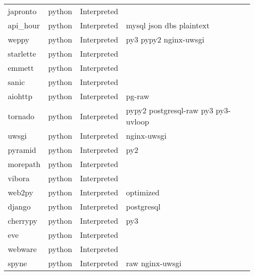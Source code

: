 \begin{longtable}{llll}
    japronto         & python      & Interpreted &                                                    \\
    api\_hour        & python      & Interpreted & mysql json dbs plaintext                           \\
    weppy            & python      & Interpreted & py3 pypy2 nginx-uwsgi                              \\
    starlette        & python      & Interpreted &                                                    \\
    emmett           & python      & Interpreted &                                                    \\
    sanic            & python      & Interpreted &                                                    \\
    aiohttp          & python      & Interpreted & pg-raw                                             \\
    tornado          & python      & Interpreted & pypy2 postgresql-raw py3 py3-uvloop                \\
    uwsgi            & python      & Interpreted & nginx-uwsgi                                        \\
    pyramid          & python      & Interpreted & py2                                                \\
    morepath         & python      & Interpreted &                                                    \\
    vibora           & python      & Interpreted &                                                    \\
    web2py           & python      & Interpreted & optimized                                          \\
    django           & python      & Interpreted & postgresql                                         \\
    cherrypy         & python      & Interpreted & py3                                                \\
    eve              & python      & Interpreted &                                                    \\
    webware          & python      & Interpreted &                                                    \\
    spyne            & python      & Interpreted & raw nginx-uwsgi                                    \\

\end{longtable}

